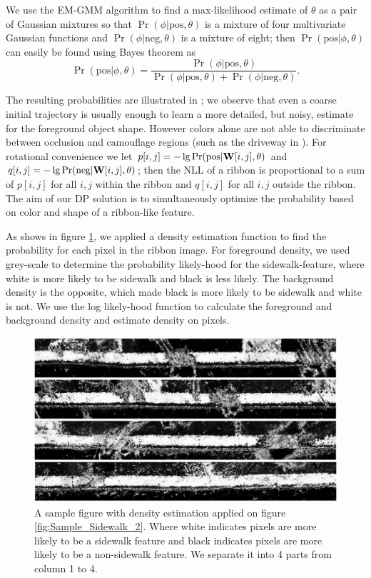 We use the EM-GMM algorithm to find a max-likelihood estimate of $\theta$ as a pair of Gaussian mixtures so that $\Pr(\phi|\text{pos}, \theta)$ is a mixture of four multivariate Gaussian functions and $\Pr(\phi|\text{neg}, \theta)$ is a mixture of eight; then $\Pr(\text{pos}|\phi, \theta)$ can easily be found using Bayes theorem as 
$$\Pr(\text{pos}|\phi, \theta)= \frac{\Pr(\phi|\text{pos}, \theta)}{\Pr(\phi|\text{pos}, \theta)+\Pr(\phi|\text{neg}, \theta)}.$$




The resulting probabilities are illustrated in ; we observe that even a coarse initial trajectory is usually enough to learn a more detailed, but noisy, estimate for the foreground object shape.
However colors alone are not able to discriminate between occlusion and camouflage regions (such as the driveway in ). 
For rotational convenience we let $p[i,j]=-\lg \Pr(\text{pos}|\mathbf{W}{}[i,j], \theta)$ and $q[i,j]=-\lg \Pr(\text{neg}|\mathbf{W}{}[i,j], \theta)$; then the \ac{NLL} of a ribbon is proportional to a sum of $p[i,j]$ for all $i,j$ within the ribbon and $q[i,j]$ for all $i,j$ outside the ribbon. 
The aim of our \ac{DP} solution is to simultaneously optimize the probability based on color and shape of a ribbon-like feature.

As shows in figure \ref{fig:GMM_Sample_2}, we applied a density estimation function to find the probability for each pixel in the ribbon image. 
For foreground density, we used grey-scale to determine the probability likely-hood for the sidewalk-feature, where white is more likely to be sidewalk and black is less likely. 
The background density is the opposite, which made black is more likely to be sidewalk and white is not. 
We use the log likely-hood function to calculate the foreground and background density and estimate density on pixels.

\begin{figure}[H]
    \centering
    \includegraphics[width=\textwidth]{Figures/GMM_SAMPLE2.png}
    \caption[Density Estimation on Sample Sidewalk]{A sample figure with density estimation applied on figure \ref{fig:Sample_Sidewalk_2}. Where white indicates pixels are more likely to be a sidewalk feature and black indicates pixels are more likely to be a non-sidewalk feature. We separate it into 4 parts from column 1 to 4.}
    \label{fig:GMM_Sample_2}
\end{figure}


